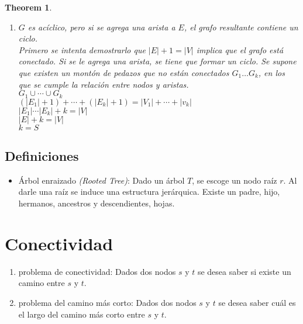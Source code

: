 \documentclass[12pt, fleqn]{article}
\newtheorem{theorem}{Theorem}[section]
\begin{document}
\begin{theorem}
\begin{enumerate}
                    \item $G$ es acíclico, pero si se agrega una arista a $E$, el grafo resultante contiene un ciclo. \\ \emph{Primero se intenta demostrarlo
                                que $|E| +1 = |V|$ implica que el grafo está conectado. Si se le agrega una arista, se tiene que formar un ciclo. Se supone que existen
                                un montón de pedazos que no están conectados $G_1 \dots G_k$, en los que se cumple la relación entre nodos y aristas.\\
                                $G_1 \cup \cdots \cup G_k$ \\ 
                                $(|E_1| +1) + \cdots + (|E_k| +1) = |V_1| +\cdots+ |v_k| $\\
                                $|E_1| \cdots |E_k| + k = |V|$ \\
                                $|E| + k = |V|$ \\
                                $k = S$  }
                \end{enumerate}
            \end{theorem}
        \subsection{Definiciones}
            \begin{itemize}
                \item Árbol enraizado \emph{(Rooted Tree)}: Dado un árbol $T$, se escoge un nodo raíz $r$. Al darle una raíz se induce una estructura jerárquica.
                    Existe un padre, hijo, hermanos, ancestros y descendientes, hojas.
            \end{itemize}
    \section{Conectividad}
        \begin{enumerate}
            \item problema de conectividad: Dados dos nodos $s$ y $t$ se desea saber si existe un camino entre $s$ y $t$.
            \item problema del camino más corto: Dados dos nodos $s$ y $t$ se desea saber cuál es el largo del camino más corto entre $s$ y $t$.
        \end{enumerate}
\end{document}

